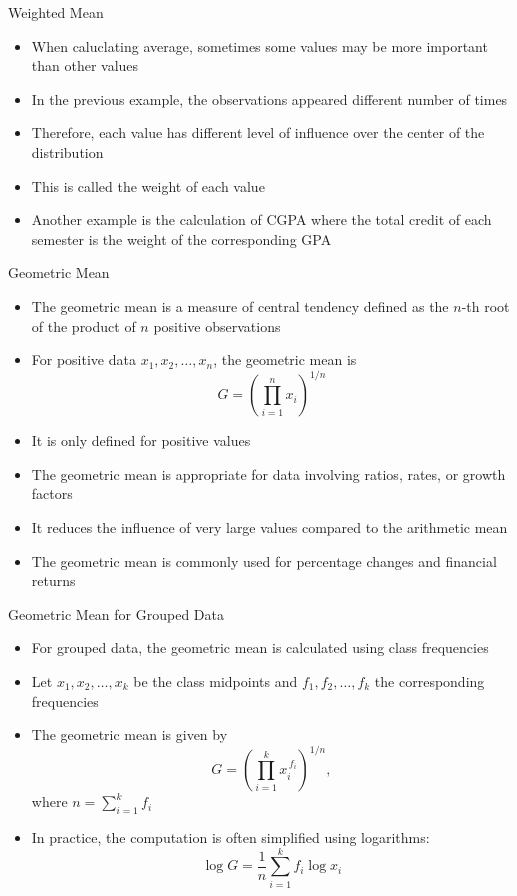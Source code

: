 \documentclass[12pt, aspectratio=169]{beamer}
\begin{document}
    \begin{frame}{Weighted Mean}
        \begin{itemize}
            \item When caluclating average, sometimes some values may be more important than other values
            \item In the previous example, the observations appeared different number of times
            \item Therefore, each value has different level of influence over the center of the distribution
            \item This is called the weight of each value
            \item Another example is the calculation of CGPA where the total credit of each semester is the weight of the corresponding GPA
        \end{itemize}
    \end{frame}


    \begin{frame}{Geometric Mean}
        \begin{itemize}
            \item The geometric mean is a measure of central tendency defined as the $n$-th root of the product of $n$ positive observations
            \item For positive data $x_1, x_2, \dots, x_n$, the geometric mean is
            \[
                G = \left( \prod_{i=1}^{n} x_i \right)^{1/n}
            \]
            \item It is only defined for positive values
            \item The geometric mean is appropriate for data involving ratios, rates, or growth factors
            \item It reduces the influence of very large values compared to the arithmetic mean
            \item The geometric mean is commonly used for percentage changes and financial returns
        \end{itemize}
    \end{frame}


    \begin{frame}{Geometric Mean for Grouped Data}
        \begin{itemize}
            \item For grouped data, the geometric mean is calculated using class frequencies
            \item Let $x_1, x_2, \dots, x_k$ be the class midpoints and $f_1, f_2, \dots, f_k$ the corresponding frequencies
            \item The geometric mean is given by
            \[
                G = \left( \prod_{i=1}^{k} x_i^{\,f_i} \right)^{1/n},
            \]
            where $n = \sum_{i=1}^{k} f_i$
            \item In practice, the computation is often simplified using logarithms:
            \[
                \log G = \frac{1}{n} \sum_{i=1}^{k} f_i \log x_i
            \]
        \end{itemize}
    \end{frame}
\end{document}
